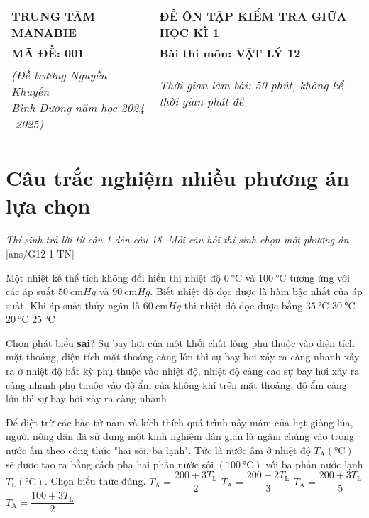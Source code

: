 \begin{tabular}{M{6.5cm}M{11cm}}
	\textbf{TRUNG TÂM MANABIE}& \textbf{ĐỀ ÔN TẬP KIỂM TRA GIỮA HỌC KÌ 1}\\
	\textbf{MÃ ĐỀ: 001}& \textbf{Bài thi môn: VẬT LÝ 12}\\
	\textit{(Đề trường Nguyễn Khuyến \newline Bình Dương năm học 2024 -2025)}& \textit{Thời gian làm bài: 50 phút, không kể thời gian phát đề}
	
	\noindent\rule{4cm}{0.8pt} \\
\end{tabular}
\setcounter{section}{0}
\section{Câu trắc nghiệm nhiều phương án lựa chọn}
\textit{Thí sinh trả lời từ câu 1 đến câu 18. Mỗi câu hỏi thí sinh chọn một phương án}
\setcounter{ex}{0}
[ans/G12-1-TN]
\begin{ex}
	Một nhiệt kế thể tích không đổi hiển thị nhiệt độ $\SI{0}{\celsius}$ và $\SI{100}{\celsius}$ tương ứng với các áp suất $\SI{50}{\centi\meter Hg}$ và $\SI{90}{\centi\meter Hg}$. Biết nhiệt độ đọc được là hàm bậc nhất của áp suất. Khi áp suất thủy ngân là $\SI{60}{\centi\meter Hg}$ thì nhiệt độ đọc được bằng
	\choice
	{$\SI{35}{\celsius}$}
	{$\SI{30}{\celsius}$}
	{$\SI{20}{\celsius}$}
	{\True $\SI{25}{\celsius}$}
\end{ex}
\begin{ex}
	Chọn phát biểu \textbf{sai}? Sự bay hơi của một khối chất lỏng
	\choice
	{phụ thuộc vào diện tích mặt thoáng, diện tích mặt thoáng càng lớn thì sự bay hơi xảy ra càng nhanh}
	{xảy ra ở nhiệt độ bất kỳ}
	{phụ thuộc vào nhiệt độ, nhiệt độ càng cao sự bay hơi xảy ra càng nhanh}
	{\True phụ thuộc vào độ ẩm của không khí trên mặt thoáng, độ ẩm càng lớn thì sự bay hơi xảy ra càng nhanh}
\end{ex}
\begin{ex}
	Để diệt trừ các bào tử nấm và kích thích quá trình nảy mầm của hạt giống lúa, người nông dân đã sử dụng một kinh nghiệm dân gian là ngâm chúng vào trong nước ấm theo công thức "hai sôi, ba lạnh". Tức là nước ấm ở nhiệt độ $T_{\mathrm{A}}\left(\si{\celsius}\right)$ sẽ được tạo ra bằng cách pha hai phần nước sôi $\left(\SI{100}{\celsius}\right)$ với ba phần nước lạnh $T_{\mathrm{L}}\left(\si{\celsius}\right)$. Chọn biểu thức đúng.
	\choice
	{$T_{\mathrm{A}}=\dfrac{200+3 T_{\mathrm{L}}}{2}$}
	{$T_{\mathrm{A}}=\dfrac{200+2 T_{\mathrm{L}}}{3}$}
	{\True $T_{\mathrm{A}}=\dfrac{200+3 T_{\mathrm{L}}}{5}$}
	{$T_{\mathrm{A}}=\dfrac{100+3 T_{\mathrm{L}}}{2}$}
\end{ex}
